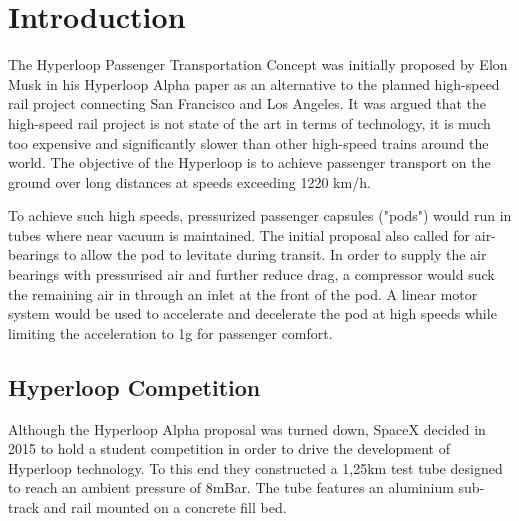 
\chapter{Introduction}

The Hyperloop Passenger Transportation Concept was initially proposed by Elon Musk in his Hyperloop Alpha paper\cite{HyperloopAlpha} as an alternative to the planned high-speed rail project connecting San Francisco and Los Angeles. It was argued that the high-speed rail project is not state of the art in terms of technology, it is much too expensive and significantly slower than other high-speed trains around the world. The objective of the Hyperloop is to achieve passenger transport on the ground over long distances at speeds exceeding 1220 km/h.

To achieve such high speeds, pressurized passenger capsules ("pods") would run in tubes where near vacuum is maintained. The initial proposal also called for air-bearings to allow the pod to levitate during transit. In order to supply the air bearings with pressurised air and further reduce drag, a compressor would suck the remaining air in through an inlet at the front of the pod. A linear motor system would be used to accelerate and decelerate the pod at high speeds while limiting the acceleration to 1g for passenger comfort.

\section{Hyperloop Competition}

Although the Hyperloop Alpha proposal was turned down, SpaceX decided in 2015 to hold a student competition\cite{HyperloopCompetiton} in order to drive the development of Hyperloop technology. To this end they constructed a 1,25km test tube designed to reach an ambient pressure of 8mBar. The tube features an aluminium sub-track and rail mounted on a concrete fill bed.

